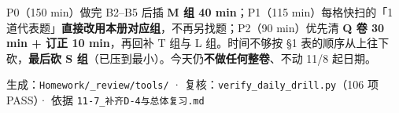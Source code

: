 \documentclass[11pt,a4paper]{ctexart}
\begin{document}
\begin{keypoint}[时间怎么排进今天]
P0（150 min）做完 B2--B5 后插 \textbf{M 组 40 min}；P1（115 min）每格快扫的「1 道代表题」\textbf{直接改用本册对应组}，不再另找题；P2（90 min）优先清 \textbf{Q 卷 30 min + 订正 10 min}，再回补 T 组与 L 组。时间不够按 \S 1 表的顺序从上往下砍，\textbf{最后砍 S 组}（已压到最小）。今天仍\textbf{不做任何整卷}、不动 11/8 起日期。
\end{keypoint}

\vfill
\begin{center}
{\small\color{gray} 生成：\texttt{Homework/\_review/tools/} · 复核：\texttt{verify\_daily\_drill.py}（106 项 PASS）· 依据 \texttt{11-7\_补齐D-4与总体复习.md}}
\end{center}
\end{document}
